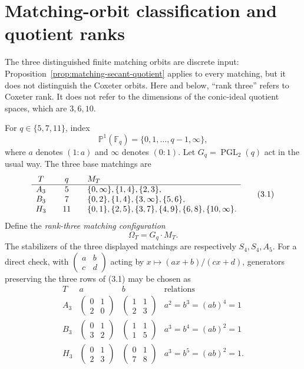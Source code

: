 \documentclass[11pt]{article}
\theoremstyle{definition}
\theoremstyle{remark}
\newcommand{\F}{\mathbb{F}}
\begin{document}
\section{Matching-orbit classification and quotient ranks}
\label{sec:rank-three}

The three distinguished finite matching orbits are discrete input:
Proposition~\ref{prop:matching-secant-quotient} applies to every matching,
but it does not distinguish the Coxeter orbits.
Here and below, ``rank three'' refers to Coxeter rank.  It does not
refer to the dimensions of the conic-ideal quotient spaces, which are
\(3,6,10\).

For $q\in\{5,7,11\}$, index
\[
 \mathbb P^1(\F_q)=\{0,1,\ldots,q-1,\infty\},
\]
where $a$ denotes $(1:a)$ and $\infty$ denotes $(0:1)$.  Let
$G_q=\operatorname{PGL}_2(q)$ act in the usual way.  The three base
matchings are
\[
\begin{array}{c@{\qquad}c@{\qquad}l}
T&q&M_T\\ \hline
A_3&5&
 \{0,\infty\},\{1,4\},\{2,3\},\\
B_3&7&
 \{0,2\},\{1,4\},\{3,\infty\},\{5,6\},\\
H_3&11&
 \{0,1\},\{2,5\},\{3,7\},\{4,9\},\{6,8\},
 \{10,\infty\}.
\end{array}                                               \tag{3.1}
\]
Define the \emph{rank-three matching configuration}
\[
 \Omega_T=G_q\cdot M_T.
\]
The stabilizers of the three displayed matchings are respectively
$S_4,S_4,A_5$.  For a direct check, with
\(\left(\begin{smallmatrix}a&b\\c&d\end{smallmatrix}\right)\) acting by
\(x\mapsto(ax+b)/(cx+d)\), generators preserving the three rows of (3.1)
may be chosen as
\[
\begin{array}{c|c|c|c}
T&a&b&\text{relations}\\
\hline
A_3&\left(\begin{smallmatrix}0&1\\2&0\end{smallmatrix}\right)
&\left(\begin{smallmatrix}1&1\\2&3\end{smallmatrix}\right)
&a^2=b^3=(ab)^4=1\\[3pt]
B_3&\left(\begin{smallmatrix}0&1\\3&2\end{smallmatrix}\right)
&\left(\begin{smallmatrix}1&1\\1&5\end{smallmatrix}\right)
&a^3=b^4=(ab)^2=1\\[3pt]
H_3&\left(\begin{smallmatrix}0&1\\2&3\end{smallmatrix}\right)
&\left(\begin{smallmatrix}0&1\\7&8\end{smallmatrix}\right)
&a^3=b^5=(ab)^2=1.
\end{array}
\]
\end{document}
